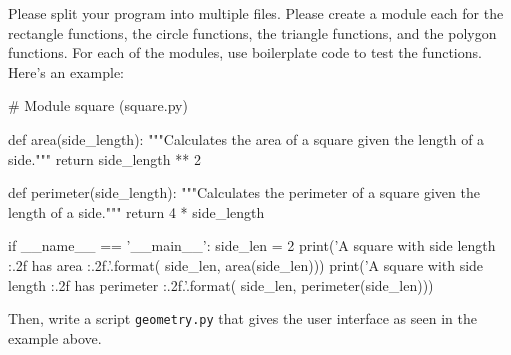 \documentclass[11pt]{cselabheader}
\begin{document}
{\begin{ex}[geometry.py]
  Please split your program into multiple files. Please create a module each for
  the rectangle functions, the circle functions, the triangle functions, and the
  polygon functions. For each of the modules, use boilerplate code to test the
  functions. Here's an example:

  \begin{python3code}
# Module square (square.py)

def area(side_length):
    """Calculates the area of a square given the length of a side."""
    return side_length ** 2

def perimeter(side_length):
    """Calculates the perimeter of a square given the length of a side."""
    return 4 * side_length

if __name__ == '__main__':
    side_len = 2
    print('A square with side length {:.2f} has area {:.2f}.'.format(
        side_len, area(side_len)))
    print('A square with side length {:.2f} has perimeter {:.2f}.'.format(
        side_len, perimeter(side_len)))
  \end{python3code}

  Then, write a script \texttt{geometry.py} that gives the user interface as
  seen in the example above.


\end{ex}}
\end{document}
